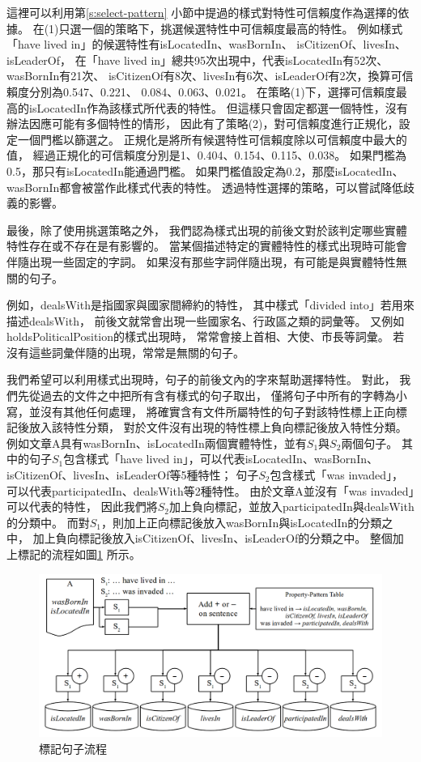 這裡可以利用第\ref{s:select-pattern} 小節中提過的樣式對特性可信賴度作為選擇的依據。
在(1)只選一個的策略下，挑選候選特性中可信賴度最高的特性。
例如樣式「have lived in」的候選特性有isLocatedIn、wasBornIn、
isCitizenOf、livesIn、isLeaderOf，
在「have lived in」總共95次出現中，代表isLocatedIn有52次、wasBornIn有21次、
isCitizenOf有8次、livesIn有6次、isLeaderOf有2次，換算可信賴度分別為0.547、0.221、
0.084、0.063、0.021。
在策略(1)下，選擇可信賴度最高的isLocatedIn作為該樣式所代表的特性。
但這樣只會固定都選一個特性，沒有辦法因應可能有多個特性的情形，
因此有了策略(2)，對可信賴度進行正規化，設定一個門檻以篩選之。
正規化是將所有候選特性可信賴度除以可信賴度中最大的值，
經過正規化的可信賴度分別是1、0.404、0.154、0.115、0.038。
如果門檻為0.5，那只有isLocatedIn能通過門檻。
如果門檻值設定為0.2，那麼isLocatedIn、wasBornIn都會被當作此樣式代表的特性。
透過特性選擇的策略，可以嘗試降低歧義的影響。

最後，除了使用挑選策略之外，
我們認為樣式出現的前後文對於該判定哪些實體特性存在或不存在是有影響的。
當某個描述特定的實體特性的樣式出現時可能會伴隨出現一些固定的字詞。
如果沒有那些字詞伴隨出現，有可能是與實體特性無關的句子。

例如，dealsWith是指國家與國家間締約的特性，
其中樣式「divided into」若用來描述dealsWith，
前後文就常會出現一些國家名、行政區之類的詞彙等。
又例如holdsPoliticalPosition的樣式出現時，
常常會接上首相、大使、市長等詞彙。
若沒有這些詞彙伴隨的出現，常常是無關的句子。

我們希望可以利用樣式出現時，句子的前後文內的字來幫助選擇特性。
對此，
我們先從過去的文件之中把所有含有樣式的句子取出，
僅將句子中所有的字轉為小寫，並沒有其他任何處理，
將確實含有文件所屬特性的句子對該特性標上正向標記後放入該特性分類，
對於文件沒有出現的特性標上負向標記後放入特性分類。
例如文章A具有wasBornIn、isLocatedIn兩個實體特性，並有$S_1$與$S_2$兩個句子。
其中的句子$S_1$包含樣式「have lived in」，可以代表isLocatedIn、wasBornIn、
isCitizenOf、livesIn、isLeaderOf等5種特性；
句子$S_2$包含樣式「was invaded」，可以代表participatedIn、dealsWith等2種特性。
由於文章A並沒有「was invaded」可以代表的特性，
因此我們將$S_2$加上負向標記，並放入participatedIn與dealsWith的分類中。
而對$S_1$，則加上正向標記後放入wasBornIn與isLocatedIn的分類之中，
加上負向標記後放入isCitizenOf、livesIn、isLeaderOf的分類之中。
整個加上標記的流程如圖\ref{i:tagging} 所示。

\begin{figure}
    \centering
    \includegraphics[width=\textwidth]{images/03-tagging}
    \caption{標記句子流程}
    \label{i:tagging}
\end{figure}


